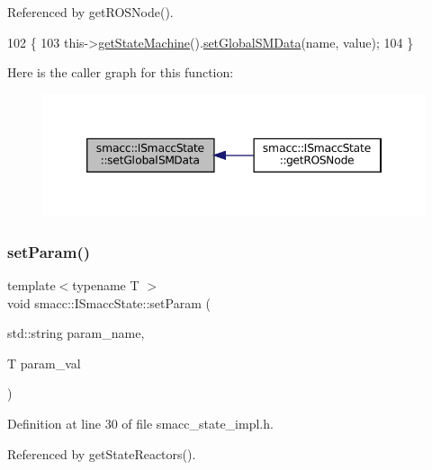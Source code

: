 Referenced by get\+R\+O\+S\+Node().


\begin{DoxyCode}
102 \{
103     this->\hyperlink{classsmacc_1_1ISmaccState_a562bb3f9a3ac16b8be71e4794c9e7523}{getStateMachine}().\hyperlink{classsmacc_1_1ISmaccStateMachine_a8588f9e580fbb95b53e2bd2ca3ff1f98}{setGlobalSMData}(name, value);
104 \}
\end{DoxyCode}
Here is the caller graph for this function\+:
\nopagebreak
\begin{figure}[H]
\begin{center}
\leavevmode
\includegraphics[width=346pt]{classsmacc_1_1ISmaccState_a120fcda41b44a437ff2e3906ac9fa5ca_icgraph}
\end{center}
\end{figure}
\mbox{\label{classsmacc_1_1ISmaccState_a0b6c531ca8c446052022308548f55b92}} 
\subsubsection{\texorpdfstring{set\+Param()}{setParam()}}
{\footnotesize\ttfamily template$<$typename T $>$ \\
void smacc\+::\+I\+Smacc\+State\+::set\+Param (\begin{DoxyParamCaption}\item[{std\+::string}]{param\+\_\+name,  }\item[{T}]{param\+\_\+val }\end{DoxyParamCaption})}



Definition at line 30 of file smacc\+\_\+state\+\_\+impl.\+h.



Referenced by get\+State\+Reactors().


